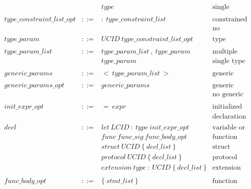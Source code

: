 $$\begin{array}{llll}
                       &     & type                             & \text{single constraint}    \\
\\
type\_constraint\_list\_opt & ::= & :\ type\_constraint\_list & \text{constrained type parameter} \\
                            &     &                           & \text{no constraints}             \\
\\
type\_param & ::= & UCID\ type\_constraint\_list\_opt & \text{type parameter} \\
\\
type\_param\_list & ::= & type\_param\_list\ ,\ type\_param & \text{multiple type parameters} \\
                  &     & type\_param                       & \text{single type parameter}    \\
\\
generic\_params & ::= & <\ type\_param\_list\ > & \text{generic parameter list} \\
\\
generic\_params\_opt & ::= & generic\_params & \text{generic parameters}    \\
                     &     &                & \text{no generic parameters} \\
\\
init\_expr\_opt & ::= & =\ expr & \text{initialized declaration}              \\
                &     &         & \text{declaration without initializer}      \\
\\
decl & ::= & let\ LCID\ :\ type\ init\_expr\_opt                  & \text{variable or field declaration}     \\
     &     & func\ func\_sig\ func\_body\_opt                     & \text{function declaration or definition} \\
     &     & struct\ UCID\ \{\ decl\_list\ \}                     & \text{struct declaration}                 \\
     &     & protocol\ UCID\ \{\ decl\_list\ \}                   & \text{protocol declaration}               \\
     &     & extension\ type\ :\ UCID\ \{\ decl\_list\ \}         & \text{extension declaration}              \\
\\
func\_body\_opt & ::= & \{\ stmt\_list\ \} & \text{function body}    \\

\end{array}$$
